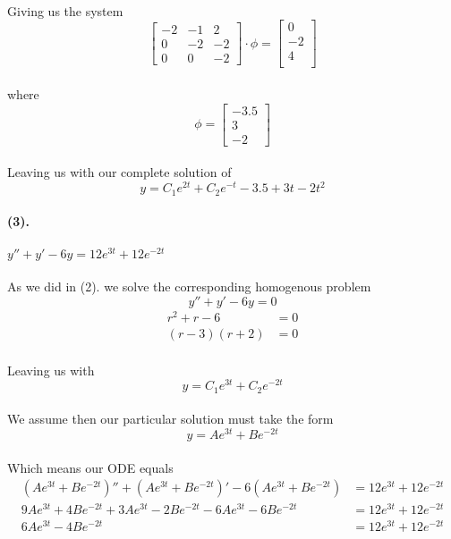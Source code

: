 \documentclass{article}
\begin{document}
\paragraph{}Giving us the system
\[
    \begin{bmatrix}
        -2 & -1 & 2 \\
        0 & -2 & -2 \\
        0 & 0 & -2
    \end{bmatrix} 
    \cdot 
    \phi
    =
    \begin{bmatrix}
    0\\
    -2\\
    4\\
    \end{bmatrix}
\]
\paragraph{}where
\[\phi = \begin{bmatrix}
    -3.5 \\
3 \\
-2
\end{bmatrix}\]
\paragraph{}Leaving us with our complete solution of 
\[
y= C_1e^{2t}+C_2e^{-t}-3.5+3t-2t^2 
\]

\paragraph{(3).}$y''+y'-6y=12e^{3t} +12e^{-2t}$
\paragraph{}As we did in (2). we solve the corresponding homogenous problem
\[
  y'' + y' - 6y = 0 
\]
\begin{align*}
    r^2 + r - 6 &= 0\\
    (r-3)(r+2) &= 0
\end{align*}
\paragraph{}Leaving us with 
\[
    y = C_1e^{3t}+C_2e^{-2t} 
\]
\paragraph{}We assume then our particular solution must take the form
\[
    y = Ae^{3t} + Be^{-2t}
\]
\paragraph{}Which means our ODE equals
\begin{align*}
    (Ae^{3t} + Be^{-2t})'' + (Ae^{3t}+Be^{-2t})' - 6(Ae^{3t}+Be^{-2t}) &= 12e^{3t}+12e^{-2t}\\
    9Ae^{3t}+4Be^{-2t} + 3Ae^{3t}-2Be^{-2t} - 6Ae^{3t}-6Be^{-2t} &= 12e^{3t} + 12e^{-2t}\\
    6Ae^{3t} -4Be^{-2t} &= 12e^{3t}+12e^{-2t}
\end{align*}
\end{document}
